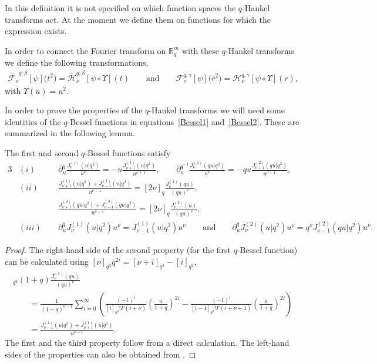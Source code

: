 \documentclass[pdftex]{sigma}
\newcommand{\mR}{\mathbb{R}}
\newcommand{\cH}{\mathcal{H}}
\newcommand{\cF}{\mathcal{F}}
\numberwithin{equation}{section}
\begin{document}
In this def\/inition it is not specif\/ied on which function spaces the $q$-Hankel transforms act. At the moment we def\/ine them on functions for which the expression exists.

In order to connect the Fourier transform on $\mR^m_q$ with these $q$-Hankel transforms we def\/ine the following transformations,
\begin{gather*}
\overline{\cF_{\nu}}^{q,\beta}[\psi]\big(t^2\big)=\overline{\cH}_{\nu}^{q,\beta}[\psi\circ\Upsilon](t)
\qquad \mbox{and} \qquad \cF_{\nu}^{q,\gamma}[\psi]\big(r^2\big)=\cH_{\nu}^{q,\gamma}[\psi\circ\Upsilon](r),
\end{gather*}
with $\Upsilon(u)=u^2$.





In order to prove the properties of the $q$-Hankel transforms we will need some identities of the $q$-Bessel functions in equations~\eqref{Bessel1} and~\eqref{Bessel2}. These are summarized in the following lemma.

\begin{lemma}
\label{lemBessel1}
The first and second $q$-Bessel functions satisfy
\begin{alignat*}{3}
& (i)& &\partial_u^q\frac{J_{\nu}^{(1)}(u|q^2)}{u^\nu}=-u\frac{J_{\nu+1}^{(1)}(u|q^2)}{u^{\nu+1}},\qquad \partial_u^{q^{-1}}\frac{J_{\nu}^{(2)}(qu|q^2)}{u^\nu}=-qu\frac{J_{\nu+1}^{(2)}(qu|q^2)}{u^{\nu+1}}, &\\
& (ii)& &\frac{J_{\nu+1}^{(1)}(u|q^2)+J_{\nu-1}^{(1)}(u|q^2)}{u^{\nu-1}}=[2\nu]_q\frac{J_{\nu}^{(1)}(qu)}{(qu)^\nu},& \\ &&& \frac{J_{\nu+1}^{(2)}(qu|q^2)+J_{\nu-1}^{(2)}(qu|q^2)}{u^{\nu-1}}=[2\nu]_q\frac{J_{\nu}^{(2)}(u)}{(qu)^\nu},&\\
& (iii) \ \ & &\partial_u^q J_{\nu}^{(1)}(u|q^2)u^\nu=J_{\nu-1}^{(1)}(u|q^2)u^\nu\qquad
 \mbox{and}\qquad \partial_u^q J_{\nu}^{(2)}(u|q^2)u^\nu=q^\nu J_{\nu-1}^{(2)}(qu|q^2)u^\nu.&
\end{alignat*}
\end{lemma}

\begin{proof}
The right-hand side of the second property (for the f\/irst $q$-Bessel function) can be calculated using $[\nu]_{q^2}q^{2i}=[\nu+i]_{q^2}-[i]_{q^2}$,
\begin{gather*}
[\nu]_{q^2}(1+q)\frac{J_\nu^{(1)}(qu)}{(qu)^\nu} \\
\qquad{}
=\frac{1}{(1+q)^{\nu-1}}\sum_{i=0}^\infty\left(\frac{(-1)^i}{[i]_{q^2}!\Gamma(i+\nu)}\left(\frac{u}{1+q}\right)^{2i}
-\frac{(-1)^i}{[i-1]_{q^2}!\Gamma(i+\nu+1)}\left(\frac{u}{1+q}\right)^{2i}\right)\\
\qquad{} =\frac{J_{\nu-1}^{(1)}(u|q^2)+J_{\nu+1}^{(1)}(u|q^2)}{u^{\nu-1}}.
\end{gather*}
The f\/irst and the third property follow from a direct calculation. The left-hand sides of the properties can also be obtained from \cite[Exercise~1.25]{MR1052153}.
\end{proof}
\end{document}

